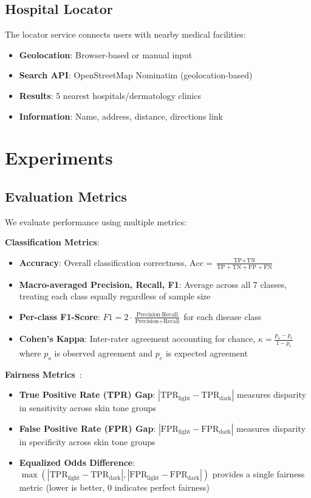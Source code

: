 \documentclass[10pt, twocolumn, letterpaper]{article}
\begin{document}
\subsection{Hospital Locator}
The locator service connects users with nearby medical facilities:
\begin{itemize}[leftmargin=*, itemsep=2pt]
    \item \textbf{Geolocation}: Browser-based or manual input
    \item \textbf{Search API}: OpenStreetMap Nominatim (geolocation-based)
    \item \textbf{Results}: 5 nearest hospitals/dermatology clinics
    \item \textbf{Information}: Name, address, distance, directions link
\end{itemize}

\section{Experiments}

\subsection{Evaluation Metrics}
We evaluate performance using multiple metrics:

\textbf{Classification Metrics}:
\begin{itemize}[leftmargin=*, itemsep=2pt]
    \item \textbf{Accuracy}: Overall classification correctness, $\text{Acc} = \frac{\text{TP} + \text{TN}}{\text{TP} + \text{TN} + \text{FP} + \text{FN}}$
    \item \textbf{Macro-averaged Precision, Recall, F1}: Average across all 7 classes, treating each class equally regardless of sample size
    \item \textbf{Per-class F1-Score}: $F1 = 2 \cdot \frac{\text{Precision} \cdot \text{Recall}}{\text{Precision} + \text{Recall}}$ for each disease class
    \item \textbf{Cohen's Kappa}: Inter-rater agreement accounting for chance, $\kappa = \frac{p_o - p_e}{1 - p_e}$ where $p_o$ is observed agreement and $p_e$ is expected agreement
\end{itemize}

\textbf{Fairness Metrics}~\cite{hardt2016}:
\begin{itemize}[leftmargin=*, itemsep=2pt]
    \item \textbf{True Positive Rate (TPR) Gap}: $|\text{TPR}_{\text{light}} - \text{TPR}_{\text{dark}}|$ measures disparity in sensitivity across skin tone groups
    \item \textbf{False Positive Rate (FPR) Gap}: $|\text{FPR}_{\text{light}} - \text{FPR}_{\text{dark}}|$ measures disparity in specificity across skin tone groups
    \item \textbf{Equalized Odds Difference}: $\max(|\text{TPR}_{\text{light}} - \text{TPR}_{\text{dark}}|, |\text{FPR}_{\text{light}} - \text{FPR}_{\text{dark}}|)$ provides a single fairness metric (lower is better, 0 indicates perfect fairness)
\end{itemize}
\end{document}
